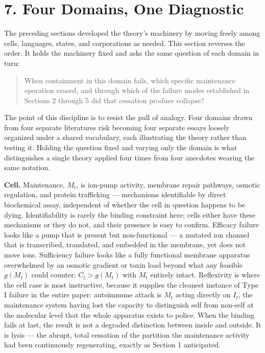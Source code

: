 \documentclass[11pt]{article}
\theoremstyle{plain}
\begin{document}
\section*{7. Four Domains, One Diagnostic}

The preceding sections developed the theory's machinery by moving freely among cells, languages, states, and corporations as needed. This section reverses the order. It holds the machinery fixed and asks the same question of each domain in turn:

\begin{quote}
When containment in this domain fails, which specific maintenance operation ceased, and through which of the failure modes established in Sections 2 through 5 did that cessation produce collapse?
\end{quote}

The point of this discipline is to resist the pull of analogy. Four domains drawn from four separate literatures risk becoming four separate essays loosely organized under a shared vocabulary, each illustrating the theory rather than testing it. Holding the question fixed and varying only the domain is what distinguishes a single theory applied four times from four anecdotes wearing the same notation.

\textbf{Cell.} Maintenance, \(M_t\), is ion-pump activity, membrane repair pathways, osmotic regulation, and protein trafficking --- mechanisms identifiable by direct biochemical assay, independent of whether the cell in question happens to be dying. Identifiability is rarely the binding constraint here; cells either have these mechanisms or they do not, and their presence is easy to confirm. Efficacy failure looks like a pump that is present but non-functional --- a mutated ion channel that is transcribed, translated, and embedded in the membrane, yet does not move ions. Sufficiency failure looks like a fully functional membrane apparatus overwhelmed by an osmotic gradient or toxin load beyond what any feasible \(g(M_t)\) could counter: \(C_t > g(M_t)\) with \(M_t\) entirely intact. Reflexivity is where the cell case is most instructive, because it supplies the cleanest instance of Type I failure in the entire paper: autoimmune attack is \(M_t\) acting directly on \(I_t\), the maintenance system having lost the capacity to distinguish self from non-self at the molecular level that the whole apparatus exists to police. When the binding fails at last, the result is not a degraded distinction between inside and outside. It is lysis --- the abrupt, total cessation of the partition the maintenance activity had been continuously regenerating, exactly as Section 1 anticipated.
\end{document}
